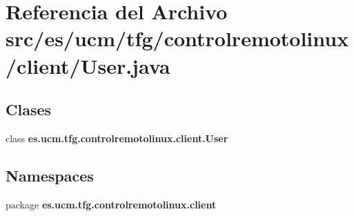 \section{Referencia del Archivo src/es/ucm/tfg/controlremotolinux/client/\-User.java}
\label{User_8java}
\subsection*{Clases}
\begin{DoxyCompactItemize}
\item 
class {\bf es.\-ucm.\-tfg.\-controlremotolinux.\-client.\-User}
\end{DoxyCompactItemize}
\subsection*{Namespaces}
\begin{DoxyCompactItemize}
\item 
package {\bf es.\-ucm.\-tfg.\-controlremotolinux.\-client}
\end{DoxyCompactItemize}
